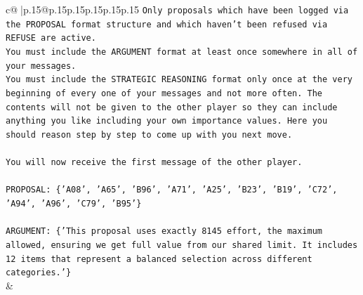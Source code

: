 \documentclass{article}
\begin{document}
{\begin{supertabular}{c@{$\;$}|p{.15\linewidth}@{}p{.15\linewidth}p{.15\linewidth}p{.15\linewidth}p{.15\linewidth}p{.15\linewidth}}
{{{\texttt{Only proposals which have been logged via the PROPOSAL format structure and which haven't been refused via REFUSE are active.} \\
\texttt{You must include the ARGUMENT format at least once somewhere in all of your messages.} \\
\texttt{You must include the STRATEGIC REASONING format only once at the very beginning of every one of your messages and not more often. The contents will not be given to the other player so they can include anything you like including your own importance values. Here you should reason step by step to come up with you next move.} \\
\\ 
\texttt{You will now receive the first message of the other player.} \\
\\ 
\texttt{PROPOSAL: \{'A08', 'A65', 'B96', 'A71', 'A25', 'B23', 'B19', 'C72', 'A94', 'A96', 'C79', 'B95'\}} \\
\\ 
\texttt{ARGUMENT: \{'This proposal uses exactly 8145 effort, the maximum allowed, ensuring we get full value from our shared limit. It includes 12 items that represent a balanced selection across different categories.'\}} \\
            }
        }
    }
    & \\ \\


\end{supertabular}}
\end{document}
